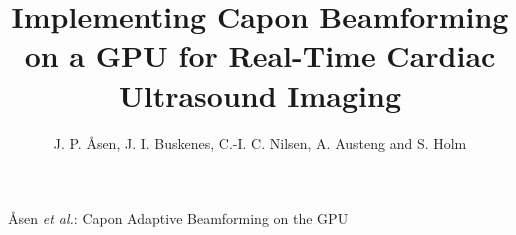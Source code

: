 \documentclass[journal]{IEEEtran}
\begin{document}
%
\title{Implementing Capon Beamforming on a GPU for Real-Time Cardiac Ultrasound Imaging}
%
%
%

\author{J. P. \AA{}sen, J. I. Buskenes, C.-I. C. Nilsen, A. Austeng and S. Holm%
}

% 
%



%
{\AA{}sen \MakeLowercase{\textit{et al.}}: Capon Adaptive Beamforming on the GPU}
% 
\end{document}
